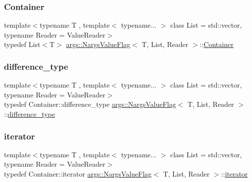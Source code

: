 \subsubsection{\texorpdfstring{Container}{Container}}
{\footnotesize\ttfamily template$<$typename T , template$<$ typename... $>$ class List = std\+::vector, typename Reader  = Value\+Reader$>$ \\
typedef List$<$T$>$ \hyperlink{classargs_1_1_nargs_value_flag}{args\+::\+Nargs\+Value\+Flag}$<$ T, List, Reader $>$\+::\hyperlink{classargs_1_1_nargs_value_flag_a27e748faa4e5ce69baf05a256e351d42}{Container}}

\mbox{\label{classargs_1_1_nargs_value_flag_a889c8ec1eafd60023e417128cd103b18}} 
\subsubsection{\texorpdfstring{difference\+\_\+type}{difference\_type}}
{\footnotesize\ttfamily template$<$typename T , template$<$ typename... $>$ class List = std\+::vector, typename Reader  = Value\+Reader$>$ \\
typedef Container\+::difference\+\_\+type \hyperlink{classargs_1_1_nargs_value_flag}{args\+::\+Nargs\+Value\+Flag}$<$ T, List, Reader $>$\+::\hyperlink{classargs_1_1_nargs_value_flag_a889c8ec1eafd60023e417128cd103b18}{difference\+\_\+type}}

\mbox{\label{classargs_1_1_nargs_value_flag_aeaf17e645a109333204dcb7c954a2473}} 
\subsubsection{\texorpdfstring{iterator}{iterator}}
{\footnotesize\ttfamily template$<$typename T , template$<$ typename... $>$ class List = std\+::vector, typename Reader  = Value\+Reader$>$ \\
typedef Container\+::iterator \hyperlink{classargs_1_1_nargs_value_flag}{args\+::\+Nargs\+Value\+Flag}$<$ T, List, Reader $>$\+::\hyperlink{classargs_1_1_nargs_value_flag_aeaf17e645a109333204dcb7c954a2473}{iterator}}

